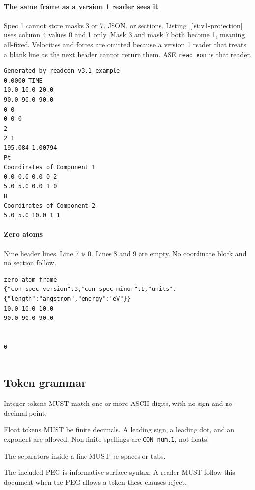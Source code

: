 \paragraph{The same frame as a version 1 reader sees
it}\label{spec:the-same-frame-as-a-version-1-reader-sees-it}

Spec 1 cannot store masks 3 or 7, JSON, or sections.
Listing~\ref{lst:v1-projection} uses column 4 values 0 and 1 only. Mask 3 and mask 7 both become
1, meaning all-fixed. Velocities and forces are omitted because a
version 1 reader that treats a blank line as the next header cannot
return them. ASE \texttt{read\_eon} is that reader.

\protect{}\label{spec:v31-as-v1}%
\begin{lstlisting}[caption={Version 1 projection of the example frame.},label={lst:v1-projection},basicstyle=\ttfamily\scriptsize,breaklines=true,showlines=true,postbreak=\mbox{$\hookrightarrow$\space}]
Generated by readcon v3.1 example
0.0000 TIME
10.0 10.0 20.0
90.0 90.0 90.0
0 0
0 0 0
2
2 1
195.084 1.00794
Pt
Coordinates of Component 1
0.0 0.0 0.0 0 2
5.0 5.0 0.0 1 0
H
Coordinates of Component 2
5.0 5.0 10.0 1 1
\end{lstlisting}

\paragraph{Zero atoms}\label{spec:zero-atoms}

Nine header lines. Line 7 is 0. Lines 8 and 9 are empty. No coordinate
block and no section follow.

\protect{}\label{spec:zero-atom-frame}%
\begin{lstlisting}[basicstyle=\ttfamily\scriptsize,breaklines=true,showlines=true,postbreak=\mbox{$\hookrightarrow$\space}]
zero-atom frame
{"con_spec_version":3,"con_spec_minor":1,"units":{"length":"angstrom","energy":"eV"}}
10.0 10.0 10.0
90.0 90.0 90.0


0


\end{lstlisting}

\subsection*{Token grammar}\label{spec:tokens}

\begin{description}
\tightlist
\item[CON-token.1 (MUST)] Integer tokens MUST match one or more ASCII digits, with no sign
and no decimal point.
\item[CON-token.2 (MUST)] Float tokens MUST be finite decimals. A leading sign, a leading
dot, and an exponent are allowed. Non-finite spellings are
\texttt{CON-num.1}, not floats.
\item[CON-token.3 (MUST)] The separators inside a line MUST be spaces or tabs.
\item[CON-token.4 (MUST)] The included PEG is informative surface syntax. A reader MUST
follow this document when the PEG allows a token these clauses reject.
\end{description}
\endgroup
